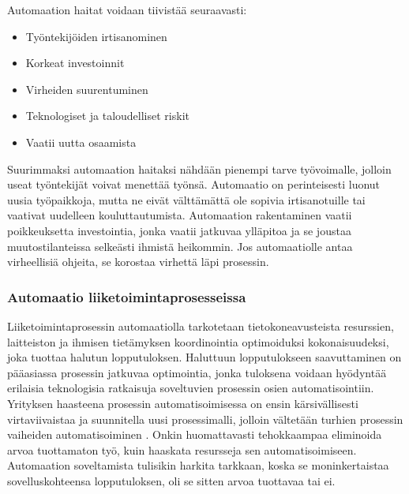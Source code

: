 \documentclass[finnish,12pt,a4paper,pdftex]{article}
\begin{document}
Automaation haitat voidaan tiivistää seuraavasti:

\begin{itemize}
\setlength{\itemsep}{0pt}
    \item Työntekijöiden irtisanominen
    \item Korkeat investoinnit
    \item Virheiden suurentuminen
    \item Teknologiset ja taloudelliset riskit
    \item Vaatii uutta osaamista
\end{itemize}

Suurimmaksi automaation haitaksi nähdään pienempi tarve työvoimalle, jolloin useat työntekijät voivat menettää työnsä. Automaatio on perinteisesti luonut uusia työpaikkoja, mutta ne eivät välttämättä ole sopivia irtisanotuille tai vaativat uudelleen kouluttautumista. Automaation rakentaminen vaatii poikkeuksetta investointia, jonka vaatii jatkuvaa ylläpitoa ja se joustaa muutostilanteissa selkeästi ihmistä heikommin. Jos automaatiolle antaa virheellisiä ohjeita, se korostaa virhettä läpi prosessin. \citep{groover}\\

\subsubsection{Automaatio liiketoimintaprosesseissa}


Liiketoimintaprosessin automaatiolla tarkotetaan tietokoneavusteista resurssien, laitteiston ja ihmisen tietämyksen koordinointia optimoiduksi kokonaisuudeksi, joka tuottaa halutun lopputuloksen. Haluttuun lopputulokseen saavuttaminen on pääasiassa prosessin jatkuvaa optimointia, jonka tuloksena voidaan hyödyntää erilaisia teknologisia ratkaisuja soveltuvien prosessin osien automatisointiin.  \citep{mohapatra}\\

Yrityksen haasteena prosessin automatisoimisessa on ensin kärsivällisesti virtaviivaistaa ja suunnitella uusi prosessimalli, jolloin vältetään turhien prosessin vaiheiden automatisoiminen \citep{mohapatra}. Onkin huomattavasti tehokkaampaa eliminoida arvoa tuottamaton työ, kuin haaskata resursseja sen automatisoimiseen. Automaation soveltamista tulisikin harkita tarkkaan, koska se moninkertaistaa sovelluskohteensa lopputuloksen, oli se sitten arvoa tuottavaa tai ei. \citep{hammer}\\
\end{document}
